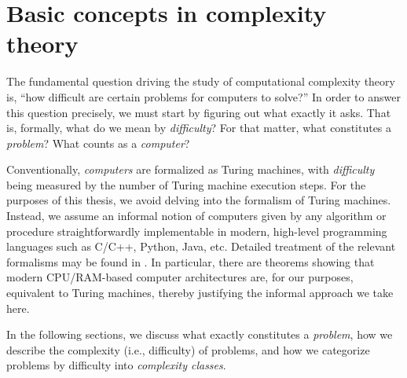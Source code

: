 \chapter{Basic concepts in complexity theory}

The fundamental question driving the study of computational complexity theory
is, ``how difficult are certain problems for computers to solve?''  In order to
answer this question precisely, we must start by figuring out what exactly it
asks.  That is, formally, what do we mean by \emph{difficulty}?  For that
matter, what constitutes a \emph{problem}?  What counts as a \emph{computer}?

Conventionally, \emph{computers} are formalized as Turing machines, with
\emph{difficulty} being measured by the number of Turing machine execution
steps.  For the purposes of this thesis, we avoid delving into the formalism of
Turing machines.  Instead, we assume an informal notion of computers given by
any algorithm or procedure straightforwardly implementable in modern,
high-level programming languages such as C/C++, Python, Java, etc.  Detailed
treatment of the relevant formalisms may be found in \textcite[Chapter
2]{papadimitriou.cc}.  In particular, there are theorems \parencite[Theorem
2.5]{papadimitriou.cc} showing that modern CPU/RAM-based computer architectures
are, for our purposes, equivalent to Turing machines, thereby justifying the
informal approach we take here.

In the following sections, we discuss what exactly constitutes a
\emph{problem}, how we describe the complexity (i.e., difficulty) of problems,
and how we categorize problems by difficulty into \emph{complexity classes}.





